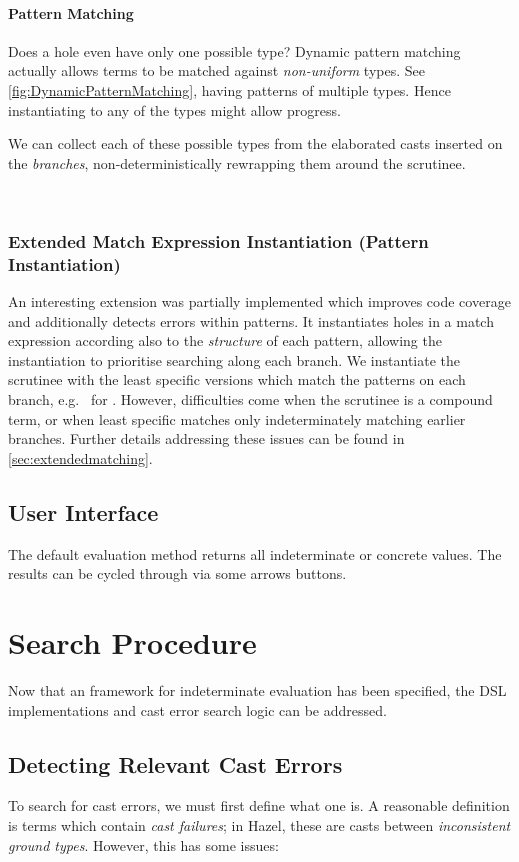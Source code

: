 \paragraph{Pattern Matching}
\label{sec:PatternMatching}
Does a hole even have only one possible type? Dynamic pattern matching actually allows terms to be matched against \textit{non-uniform} types. See \cref{fig:DynamicPatternMatching}, having patterns of multiple types. Hence instantiating to any of the types might allow progress.

We can collect each of these possible types from the elaborated casts inserted on the \textit{branches}, non-deterministically rewrapping them around the scrutinee.
\ 
\par
\ 
\par
\subsubsection{Extended Match Expression Instantiation (Pattern Instantiation)}
\label{sec:ExtendedPatternMatching}
An interesting extension was partially implemented which improves code coverage and additionally detects errors within patterns. It instantiates holes in a match expression according also to the \textit{structure} of each pattern, allowing the instantiation to prioritise searching along each branch. We instantiate the scrutinee with the least specific versions which match the patterns on each branch, e.g. \dyn\code{::}\dyn\ for . However, difficulties come when the scrutinee is a compound term, or when least specific matches only indeterminately matching earlier branches. Further details addressing these issues can be found in \cref{sec:extendedmatching}.

\subsection{User Interface}\label{sec:UIIndetEval}
The default evaluation method returns all indeterminate or concrete values. The results can be cycled through via some arrows buttons.

\section{Search Procedure}\label{sec:SearchProcedure}
Now that an framework for indeterminate evaluation has been specified, the DSL implementations and cast error search logic can be addressed.

\subsection{Detecting Relevant Cast Errors}
\label{sec:CastFailureDetection}
To search for cast errors, we must first define what one is. A reasonable definition is terms which contain \textit{cast failures}; in Hazel, these are casts between \textit{inconsistent ground types}. However, this has some issues:

